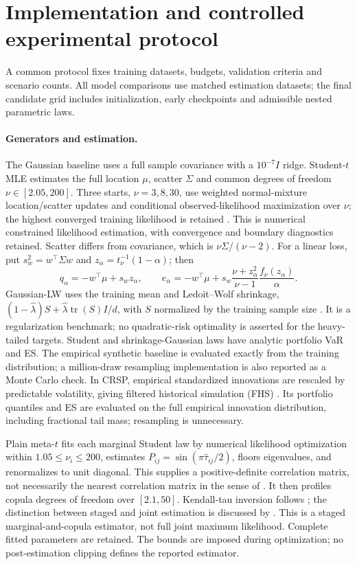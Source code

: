 \documentclass[11pt]{article}
\theoremstyle{definition}\newtheorem{definition}[theorem]{Definition}
\theoremstyle{remark}\newtheorem{remark}[theorem]{Remark}
\begin{document}
\section{Implementation and controlled experimental protocol}\label{sec:practice}
A common protocol fixes training datasets, budgets, validation criteria and scenario counts. All model comparisons use matched estimation datasets; the final candidate grid includes initialization, early checkpoints and admissible nested parametric laws.

\paragraph{Generators and estimation.}
The Gaussian baseline uses a full sample covariance with a $10^{-7}I$ ridge. Student-$t$ MLE estimates the full location $\mu$, scatter $\Sigma$ and common degrees of freedom $\nu\in[2.05,200]$. Three starts, $\nu=3,8,30$, use weighted normal-mixture location/scatter updates and conditional observed-likelihood maximization over $\nu$; the highest converged training likelihood is retained \citep{liu1995t}. This is numerical constrained likelihood estimation, with convergence and boundary diagnostics retained. Scatter differs from covariance, which is $\nu\Sigma/(\nu-2)$. For a linear loss, put $s_w^2=w^\top\Sigma w$ and $z_\alpha=t_\nu^{-1}(1-\alpha)$; then
\[
 q_\alpha=-w^\top\mu+s_wz_\alpha,\qquad
 e_\alpha=-w^\top\mu+s_w\frac{\nu+z_\alpha^2}{\nu-1}\frac{f_\nu(z_\alpha)}{\alpha}.
\]
Gaussian-LW uses the training mean and Ledoit--Wolf shrinkage, $(1-\widehat\lambda)S+\widehat\lambda\operatorname{tr}(S)I/d$, with $S$ normalized by the training sample size \citep{ledoit2004}. It is a regularization benchmark; no quadratic-risk optimality is asserted for the heavy-tailed targets. Student and shrinkage-Gaussian laws have analytic portfolio VaR and ES. The empirical synthetic baseline is evaluated exactly from the training distribution; a million-draw resampling implementation is also reported as a Monte Carlo check. In CRSP, empirical standardized innovations are rescaled by predictable volatility, giving filtered historical simulation (FHS) \citep{baroneadesi1999fhs}. Its portfolio quantiles and ES are evaluated on the full empirical innovation distribution, including fractional tail mass; resampling is unnecessary.

Plain meta-$t$ fits each marginal Student law by numerical likelihood optimization within $1.05\le\nu_i\le200$, estimates $P_{ij}=\sin(\pi\widehat\tau_{ij}/2)$, floors eigenvalues, and renormalizes to unit diagonal. This supplies a positive-definite correlation matrix, not necessarily the nearest correlation matrix in the sense of \citet{higham2002}. It then profiles copula degrees of freedom over $[2.1,50]$. Kendall-tau inversion follows \citet{lindskog2003kendall}; the distinction between staged and joint estimation is discussed by \citet{joe2005}. This is a staged marginal-and-copula estimator, not full joint maximum likelihood. Complete fitted parameters are retained. The bounds are imposed during optimization; no post-estimation clipping defines the reported estimator.
\end{document}
